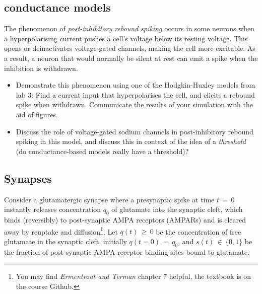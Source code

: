\documentclass[11pt]{article}
\begin{document}
\subsection{conductance models ~ \normalfont [5 marks]}

The phenomenon of \textit{post-inhibitory rebound spiking} occurs in some neurons when a hyperpolarising current pushes a cell's voltage below its resting voltage. This opens or deinactivates voltage-gated channels, making the cell more excitable. As a result, a neuron that would normally be silent at rest can emit a spike when the inhibition is withdrawn.
\begin{itemize}
\item[\textbf{(i)}] Demonstrate this phenomenon using one of the Hodgkin-Huxley models from lab 3: Find a current input that hyperpolarises the cell, and elicits a rebound spike when withdrawn. Communicate the results of your simulation with the aid of figures. 
\item[\textbf{(ii)}] Discuss the role of voltage-gated sodium channels in post-inhibitory rebound spiking in this model, and discuss this in context of the idea of a \textit{threshold} (do conductance-based models really have a threshold)? 
\end{itemize}


\clearpage
\subsection{Synapses ~ \normalfont [5 marks]}


Consider a glutamatergic synapse where a presynaptic spike at time $t\,{=}\,0$ instantly releases concentration $q_0$ of glutamate into the synaptic cleft, which binds (reversibly) to post-synaptic AMPA receptors (AMPARs) and is cleared away by reuptake and diffusion\footnote{You may find \textit{Ermentrout and Terman} chapter 7 helpful, the textbook is on the course Github.}. Let $q(t)\,{\ge}\,0$ be the concentration of free glutamate in the synaptic cleft, initially $q(t{=}0)\,{=}\,q_0$, and $s(t)\,{\in}\,\{0,1\}$ be the fraction of post-synaptic AMPA receptor binding sites bound to glutamate.
\end{document}
